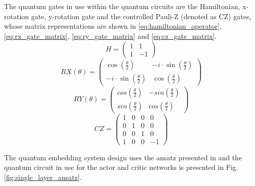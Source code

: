 The quantum gates in use within the quantum circuits are the Hamiltonian, x-rotation gate, y-rotation gate and the controlled Pauli-Z (denoted as CZ) gates, whose matrix representations are shown in \ref{eq:hamiltonian_operator}, \ref{eq:rx_gate_matrix}, \ref{eq:ry_gate_matrix} and \ref{eq:cz_gate_matrix}. 
\begin{equation} \label{eq:hamiltonian_operator}
   H = \begin{pmatrix}
       1 & 1 \\
       1 & -1
   \end{pmatrix} 
\end{equation}
\begin{equation} \label{eq:rx_gate_matrix}
   RX (\theta) = \begin{pmatrix}
       \cos(\frac{\theta}{2}) & -i \cdot \sin(\frac{\theta}{2}) \\
        -i \cdot \sin(\frac{\theta}{2}) & \cos(\frac{\theta}{2})
   \end{pmatrix} 
\end{equation}
\begin{equation} \label{eq:ry_gate_matrix}
   RY (\theta) = \begin{pmatrix}
        cos(\frac{\theta}{2}) & -sin(\frac{\theta}{2}) \\
        sin(\frac{\theta}{2}) & cos(\frac{\theta}{2})
    \end{pmatrix} 
\end{equation}
\begin{equation} \label{eq:cz_gate_matrix}
   CZ = \begin{pmatrix}
       1 & 0 & 0 & 0 \\
       0 & 1 & 0 & 0 \\
       0 & 0 & 1 & 0 \\
       1 & 0 & 0 & -1
   \end{pmatrix} 
\end{equation}

The quantum embedding system design uses the ansatz presented in \cite{silvirianti_layerwise_2024} and the quantum circuit in use for the actor and critic networks is presented in Fig. \ref{fig:single_layer_ansatz}. 

